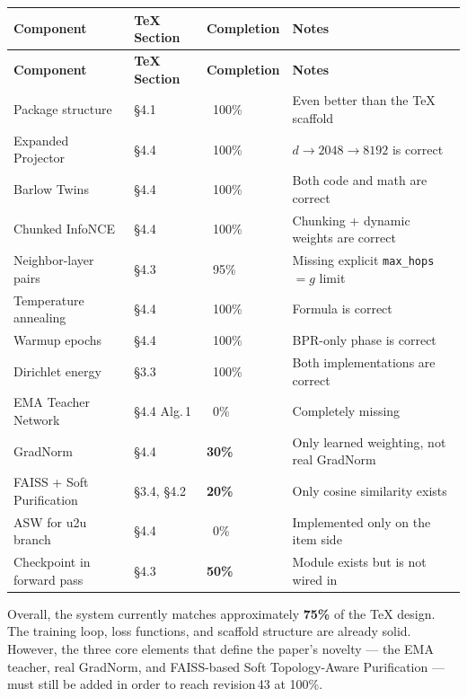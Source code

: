 \documentclass[11pt,a4paper]{article}
\newcommand{\cmark}{\textcolor{DarkGreen}{\ding{52}}}
\newcommand{\xmark}{\textcolor{CritRed}{\ding{56}}}
\begin{document}
{
\renewcommand{\arraystretch}{1.35}
%
\begin{longtable}{|>{\raggedright\arraybackslash}p{}
  |>{\raggedright\arraybackslash}p{}
  |>{\raggedright\arraybackslash}p{}
  |>{\raggedright\arraybackslash}p{}|}
\hline
\rowcolor{TableHead}
\textbf{Component} & \textbf{\TeX{} Section} & \textbf{Completion} & \textbf{Notes} \\
\hline
\endfirsthead
\hline
\rowcolor{TableHead}
\textbf{Component} & \textbf{\TeX{} Section} & \textbf{Completion} & \textbf{Notes} \\
\hline
\endhead
Package structure & \S4.1 & \cmark\ 100\% & Even better than the \TeX{} scaffold \\\hline
Expanded Projector & \S4.4 & \cmark\ 100\% & $d \rightarrow 2048 \rightarrow 8192$ is correct \\\hline
Barlow Twins & \S4.4 & \cmark\ 100\% & Both code and math are correct \\\hline
Chunked InfoNCE & \S4.4 & \cmark\ 100\% & Chunking + dynamic weights are correct \\\hline
Neighbor-layer pairs & \S4.3 & \cmark\ 95\% & Missing explicit \texttt{max\_hops} $= g$ limit \\\hline
Temperature annealing & \S4.4 & \cmark\ 100\% & Formula is correct \\\hline
Warmup epochs & \S4.4 & \cmark\ 100\% & BPR-only phase is correct \\\hline
Dirichlet energy & \S3.3 & \cmark\ 100\% & Both implementations are correct \\\hline
EMA Teacher Network & \S4.4 Alg.\,1 & \xmark\ 0\% & Completely missing \\\hline
GradNorm & \S4.4 & \textcolor{WarnAmber}{\textbf{30\%}} & Only learned weighting, not real GradNorm \\\hline
FAISS + Soft Purification & \S3.4, \S4.2 & \textcolor{WarnAmber}{\textbf{20\%}} & Only cosine similarity exists \\\hline
ASW for u2u branch & \S4.4 & \xmark\ 0\% & Implemented only on the item side \\\hline
Checkpoint in forward pass & \S4.3 & \textcolor{WarnAmber}{\textbf{50\%}} & Module exists but is not wired in \\\hline
\end{longtable}
%
}

\vspace{0.4em}
\noindent Overall, the system currently matches approximately \textbf{75\%} of the \TeX{} design.
The training loop, loss functions, and scaffold structure are already solid.
However, the three core elements that define the paper's novelty --- the EMA teacher, real GradNorm, and FAISS-based Soft Topology-Aware Purification --- must still be added in order to reach revision\,43 at 100\%.
\end{document}
